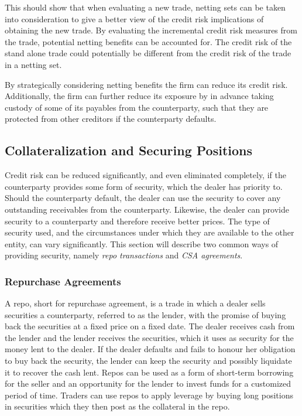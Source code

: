 \documentclass[main.tex]{subfiles}
\begin{document}
        This should show that when evaluating a new trade,
        netting sets can be taken into consideration to give a better view 
        of the credit risk implications of obtaining the new trade.
        By evaluating the incremental credit risk measures from the trade,
        potential netting benefits can be accounted for. 
        The credit risk of the stand alone trade could potentially 
        be different from the credit risk of the trade in a netting set.

        By strategically considering netting benefits the firm can reduce its credit risk. 
        Additionally, the firm can further reduce its exposure by in advance
        taking custody of some of its payables from the counterparty,
        such that they are protected from other creditors if the counterparty defaults.

    \subsection{Collateralization and Securing Positions}
        Credit risk can be reduced significantly, and even eliminated completely,
        if the counterparty provides some form of security, which the dealer has priority to.
        Should the counterparty default, the dealer can use the security to cover any
        outstanding receivables from the counterparty. 
        Likewise, the dealer can provide security to a counterparty and 
        therefore receive better prices.
        The type of security used, and the circumstances 
        under which they are available to the other entity, can vary significantly.
        This section will describe two common ways of providing security, 
        namely \textit{repo transactions} and \textit{CSA agreements}.

        \subsubsection{Repurchase Agreements}
        A repo, short for repurchase agreement, is a trade in which a dealer 
        sells securities a counterparty, referred to as the lender, 
        with the promise of buying back the securities at a fixed price on a fixed date.
        The dealer receives cash from the lender and the lender receives the securities,
        which it uses as security for the money lent to the dealer. 
        If the dealer defaults and fails to honour her obligation to buy back the security,
        the lender can keep the security and possibly liquidate it to recover the cash lent. 
        Repos can be used as a form of short-term borrowing for the seller
        and an opportunity for the lender to invest funds for a customized period of time. 
        Traders can use repos to apply leverage by buying long positions in securities 
        which they then post as the collateral in the repo. 
\end{document}
